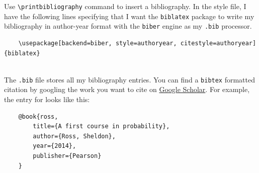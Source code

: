 \documentclass[12pt, notitlepage]{article}
\begin{document}
\begin{notes}
Use \verb|\printbibliography| command to insert a bibliography. In the style file, I have the following lines specifying that I want the \texttt{biblatex} package to write my bibliography in author-year format with the  \texttt{biber} engine as my \texttt{.bib} processor.
	\begin{verbatim}
	\usepackage[backend=biber, style=authoryear, citestyle=authoryear]{biblatex}
	
	\end{verbatim}
The \texttt{.bib} file stores all my bibliography entries. You can find a \texttt{bibtex} formatted citation by googling the work you want to cite on \href{https://scholar.google.com/}{Google Scholar}. For example, the entry for \cite{ross} looks like this:
	\begin{verbatim}
	@book{ross,
  		title={A first course in probability},
  		author={Ross, Sheldon},
  		year={2014},
  		publisher={Pearson}
	}
	\end{verbatim}
\end{notes}

\printbibliography
\end{document}
